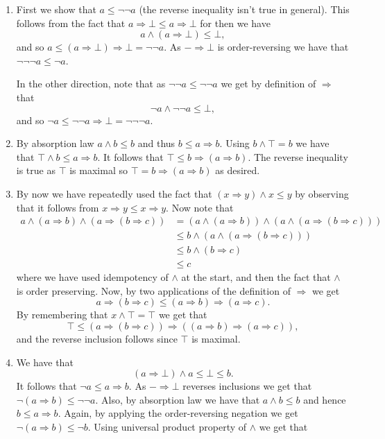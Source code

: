 \documentclass{article}
\theoremstyle{plain}
\begin{document}
\begin{enumerate}
\begin{enumerate}
			\item First we show that $a\leq \neg\neg a$ (the reverse inequality isn't true in general). This follows from the fact that $a\Rightarrow \bot \leq a\Rightarrow \bot$ for then we have 
			\[
				a\wedge (a\Rightarrow \bot) \leq \bot,
			\]
			and so $a\leq (a\Rightarrow \bot)\Rightarrow \bot = \neg\neg a$. As $- \Rightarrow \bot$ is order-reversing we have that $\neg\neg\neg a \leq \neg a$.
			
			In the other direction, note that as $\neg\neg a \leq \neg\neg a$ we get by definition of $\Rightarrow$ that
			\[
				\neg a \wedge \neg\neg a \leq \bot,
			\]
			and so $\neg a \leq \neg\neg a \Rightarrow \bot = \neg\neg\neg a$.
			\item By absorption law $a\wedge b \leq b$ and thus $b \leq a \Rightarrow b$. Using $b\wedge \top = b$ we have that $\top \wedge b \leq a\Rightarrow b$. It follows that $\top \leq b \Rightarrow (a\Rightarrow b)$. The reverse inequality is true as $\top$ is maximal so $\top = b \Rightarrow (a\Rightarrow b)$ as desired.
			\item By now we have repeatedly used the fact that $(x\Rightarrow y) \wedge x\leq y$ by observing that it follows from $x\Rightarrow y \leq x \Rightarrow y$. Now note that 
			\begin{align*}
				a\wedge (a\Rightarrow b) \wedge ( a \Rightarrow (b\Rightarrow c))  &= (a \wedge (a\Rightarrow b)) \wedge (a \wedge ( a \Rightarrow (b\Rightarrow c)))\\
				&\leq b \wedge (a \wedge ( a \Rightarrow (b\Rightarrow c))) \\
				&\leq b \wedge (b \Rightarrow c)\\
				&\leq c
			\end{align*}
			where we have used idempotency of $\wedge$ at the start, and then the fact that $\wedge$ is order preserving. Now, by two applications of the definition of $\Rightarrow$ we get
			\[
				a\Rightarrow (b\Rightarrow c) \leq (a\Rightarrow b) \Rightarrow (a\Rightarrow c).
			\]
			By remembering that $x\wedge \top = \top$ we get that 
			\[
				\top \leq (a\Rightarrow (b\Rightarrow c)) \Rightarrow ((a\Rightarrow b) \Rightarrow (a\Rightarrow c)),
			\]
			and the reverse inclusion follows since $\top$ is maximal.
			\item We have that
			\[
				(a\Rightarrow \bot) \wedge a  \leq \bot \leq b.
			\]
			It follows that $\neg a \leq a\Rightarrow b$. As $- \Rightarrow \bot$ reverses inclusions we get that $\neg(a\Rightarrow b) \leq \neg\neg a$. Also, by absorption law we have that $a\wedge b \leq b$ and hence $b\leq a \Rightarrow b$. Again, by applying the order-reversing negation we get $\neg(a\Rightarrow b) \leq \neg b$. Using universal product property of $\wedge$ we get that 

\end{enumerate}
\end{enumerate}
\end{document}
